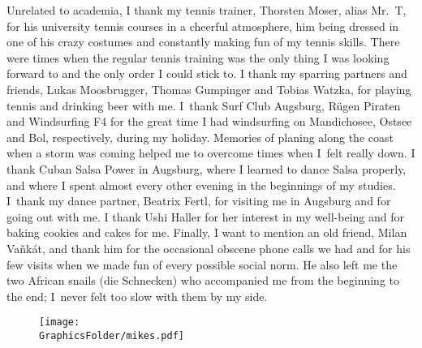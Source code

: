 \documentclass[\MainFolder/Text.tex]{subfiles}
\begin{document}
Unrelated to academia, I thank my tennis trainer, Thorsten Moser, alias Mr.~T, for his university tennis courses in a cheerful atmosphere, him being dressed in one of his crazy costumes and constantly making fun of my tennis skills. There were times when the regular tennis training was the only thing I was looking forward to and the only order I could stick to. I thank my sparring partners and friends, Lukas Moosbrugger, Thomas Gumpinger and Tobias Watzka, for playing tennis and drinking beer with me. I~thank Surf Club Augsburg, R\"ugen Piraten and Windsurfing F4 for the great time I had windsurfing on Mandichosee, Ostsee and Bol, respectively, during my holiday. Memories of planing along the coast when a storm was coming helped me to overcome times when I~felt really down. I thank Cuban Salsa Power in Augsburg, where I learned to dance Salsa properly, and where I spent almost every other evening in the beginnings of my studies. I~thank my dance partner, Beatrix Fertl, for visiting me in Augsburg and for going out with me. I thank Ushi Haller for her interest in my well-being and for baking cookies and cakes for me. Finally, I want to mention an old friend, Milan Va\v nk\'at, and thank him for the occasional obscene phone calls we had and for his few visits when we made fun of every possible social norm. He also left me the two African snails (die Schnecken) who accompanied me from the beginning to the end; I~never felt too slow with them by my side.

\begin{figure}[!b]
\centering
\texttt{[image: \\GraphicsFolder/mikes.pdf]}
\end{figure}
%

\end{document}
